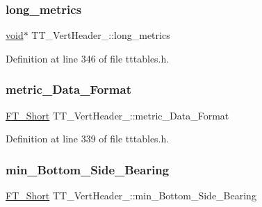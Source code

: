 \mbox{\label{struct_t_t___vert_header___ac789245d0d6243bc965ad43702bdc671}} 
\subsubsection{\texorpdfstring{long\_metrics}{long\_metrics}}
{\footnotesize\ttfamily \mbox{\hyperlink{_s_d_l__opengles2__gl2ext_8h_ae5d8fa23ad07c48bb609509eae494c95}{void}}$\ast$ T\+T\+\_\+\+Vert\+Header\+\_\+\+::long\+\_\+metrics}



Definition at line 346 of file tttables.\+h.

\mbox{\label{struct_t_t___vert_header___aa7c3983f62f7bf736eaaaae684b65dd7}} 
\subsubsection{\texorpdfstring{metric\_Data\_Format}{metric\_Data\_Format}}
{\footnotesize\ttfamily \mbox{\hyperlink{fttypes_8h_aa7279be89046a2563cd3d4d6651fbdcf}{F\+T\+\_\+\+Short}} T\+T\+\_\+\+Vert\+Header\+\_\+\+::metric\+\_\+\+Data\+\_\+\+Format}



Definition at line 339 of file tttables.\+h.

\mbox{\label{struct_t_t___vert_header___a21422639a4cfd8dcdc9ebb3795676292}} 
\subsubsection{\texorpdfstring{min\_Bottom\_Side\_Bearing}{min\_Bottom\_Side\_Bearing}}
{\footnotesize\ttfamily \mbox{\hyperlink{fttypes_8h_aa7279be89046a2563cd3d4d6651fbdcf}{F\+T\+\_\+\+Short}} T\+T\+\_\+\+Vert\+Header\+\_\+\+::min\+\_\+\+Bottom\+\_\+\+Side\+\_\+\+Bearing}



